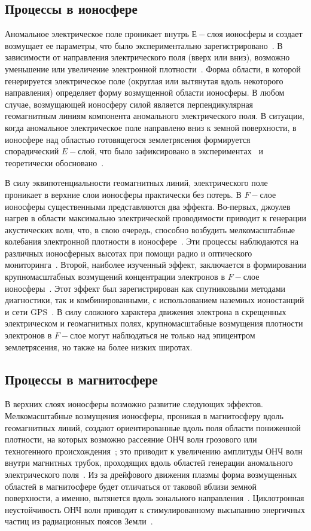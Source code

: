 \documentclass[12pt, oneside, a4paper]{article}
\begin{document}
\subsection{Процессы в ионосфере}
Аномальное электрическое поле проникает внутрь $Е-$слоя ионосферы и создает возмущает ее параметры, что было экспериментально зарегистрировано~\cite{Liperovsky:2000}. В зависимости от направления электрического поля (вверх или вниз), возможно уменьшение или увеличение электронной плотности~\cite{Pulinets:1998}. Форма области, в которой генерируется электрическое поле (округлая или вытянутая вдоль некоторого направления) определяет форму возмущенной области ионосферы. В любом случае,  возмущающей ионосферу силой является перпендикулярная геомагнитным линиям компонента аномального электрического поля. В ситуации, когда аномальное электрическое поле направлено вниз к земной поверхности, в ионосфере над областью готовящегося землетрясения формируется спорадический $E-$слой, что было зафиксировано в экспериментах~\cite{Ondoh_Hayakawa:1999} и теоретически обосновано~\cite{Kim:1994}.

В силу эквипотенциальности геомагнитных линий, электрического поле проникает в верхние слои ионосферы практически без потерь. В $F-$слое ионосферы существенными представляются два эффекта. Во-первых, джоулев нагрев в области максимально электрической проводимости  приводит к генерации акустических волн, что, в свою очередь, способно возбудить мелкомасштабные колебания электронной плотности в ионосфере~\cite{Hegai:1997}. Эти процессы наблюдаются на различных ионосферных высотах при помощи радио и оптического мониторинга~\cite{Chmyrev:1997}. Второй, наиболее изученный эффект, заключается в формировании крупномасштабных возмущений концентрации электронов в $F-$слое ионосферы~\cite{Pulinets_Legenka:2003}. Этот эффект был зарегистрирован как спутниковыми методами диагностики, так и комбинированными, с использованием наземных ионостанций и сети GPS~\cite{Lui:2004}. В силу сложного характера движения электрона в скрещенных электрическом и геомагнитных полях, крупномасштабные возмущения плотности электронов в $F-$слое могут наблюдаться  не только над  эпицентром землетрясения, но также на более низких широтах. 
\subsection{Процессы в магнитосфере}
В верхних слоях ионосферы возможно развитие следующих эффектов. Мелкомасштабные возмущения ионосферы, проникая в магнитосферу вдоль геомагнитных линий, создают ориентированные вдоль поля области пониженной плотности, на которых возможно рассеяние ОНЧ волн грозового или техногенного происхождения~\cite{Kim_Hegai:1997}; это приводит к увеличению амплитуды ОНЧ волн внутри магнитных трубок, проходящих вдоль областей генерации аномального электрического поля~\cite{Shklyar_Nagano:1998}. Из за дрейфового движения плазмы форма возмущенных областей в магнитосфере будет отличаться от таковой вблизи земной поверхности, а именно, вытянется вдоль зонального направления~\cite{Kim_Hegai:1997}. Циклотронная неустойчивость ОНЧ волн приводит к стимулированному высыпанию  энергичных частиц из радиационных поясов Земли~\cite{Galper:1995}.
\end{document}
